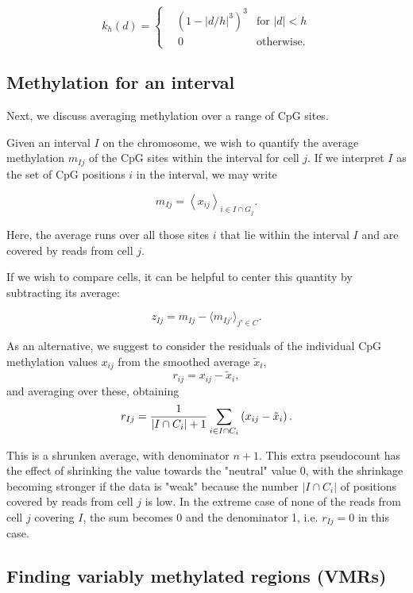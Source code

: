 \documentclass[twocolumn,10pt]{article}
\begin{document}
\[ k_h(d) = \left\{
\begin{aligned}
    &\left(1-|d/h|^3\right)^3 &\text{for } |d|<h \\
    &\,0 &\text{otherwise}. 
\end{aligned}
\right.
\]

\subsection{Methylation for an interval}

Next, we discuss averaging methylation over a range of CpG sites.

Given an interval $I$ on the chromosome, we wish to quantify the average methylation $m_{Ij}$ of the CpG sites within the interval for cell $j$. If we interpret $I$ as the set of CpG positions $i$ in the interval, we may write

$$ m_{Ij} = \left< x_{ij} \right>_{i\in I\cap G_j}.$$

Here, the average runs over all those sites $i$ that lie within the interval $I$ and are covered by reads from cell $j$.

If we wish to compare cells, it can be helpful to center this quantity by subtracting its average:

$$ z_{Ij} = m_{Ij} - \langle m_{Ij'}\rangle_{j'\in C}.$$

As an alternative, we suggest to consider the residuals of the individual CpG methylation values $x_{ij}$ from the smoothed average $\tilde x_i$,
$$ r_{ij} = x_{ij} - \tilde x_i, $$
and averaging over these, obtaining
\begin{equation} 
r_{Ij} = \frac{\scriptsize{1}}{\scriptsize{|I\cap C_i|+1}}\sum_{i\in I\cap C_i}\left( x_{ij} - \tilde x_i \right). \label{avgres}
\end{equation}

This is a shrunken average, with denominator $n+1$. This extra pseudocount has the effect of shrinking the value towards the "neutral" value 0, with the shrinkage becoming stronger if the data is "weak" because the number $|I\cap C_i|$ of positions covered by reads from cell $j$  is low. In the extreme case of none of the reads from cell $j$ covering $I$, the sum becomes 0 and the denominator 1, i.e. $r_{Ij}=0$ in this case.

\subsection{Finding variably methylated regions (VMRs)}
\end{document}
